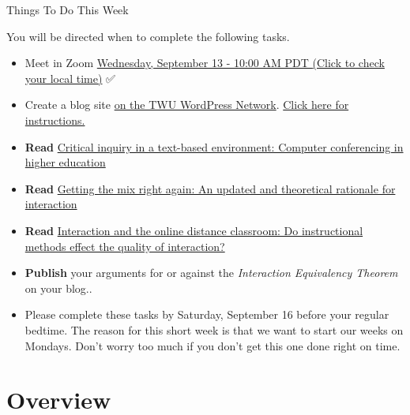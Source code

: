 \documentclass[
]{book}
\providecommand{\tightlist}{%
  \setlength{\itemsep}{0pt}\setlength{\parskip}{0pt}}
\begin{document}
\begin{feedback}
{Things To Do This Week}

You will be directed when to complete the following tasks.

\begin{itemize}
\tightlist
\item
  Meet in Zoom \href{https://www.timeanddate.com/worldclock/fixedtime.html?msg=LDRS663+Meeting\&iso=20230913T10\&p1=256\&ah=1}{{Wednesday, September 13 - 10:00 AM PDT }(Click to check your local time)} ✅
\item
  Create a blog site \href{https://create.twu.ca}{on the TWU WordPress Network}. \href{https://ma-lead.github.io/ldrs663/wordpress}{Click here for instructions.}\\
\item
  \textbf{Read} \href{https://www-sciencedirect-com.twu.idm.oclc.org/science/article/pii/S1096751600000166}{Critical inquiry in a text-based environment: Computer conferencing in higher education}\\
\item
  \textbf{Read} \href{http://www.irrodl.org/index.php/irrodl/article/view/149/230}{Getting the mix right again: An updated and theoretical rationale for interaction}\\
\item
  \textbf{Read} \href{https://link-springer-com.ezproxy.student.twu.ca/article/10.1007/s12528-011-9049-4}{Interaction and the online distance classroom: Do instructional methods effect the quality of interaction?}\\
\item
  \textbf{Publish} your arguments for or against the \emph{Interaction Equivalency Theorem} on your blog..\\
\item
  Please complete these tasks by {Saturday, September 16} before your regular bedtime. The reason for this short week is that we want to start our weeks on Mondays. Don't worry too much if you don't get this one done right on time.
\end{itemize}
\end{feedback}

\hypertarget{overview}{%
\section*{Overview}\label{overview}}
\end{document}
